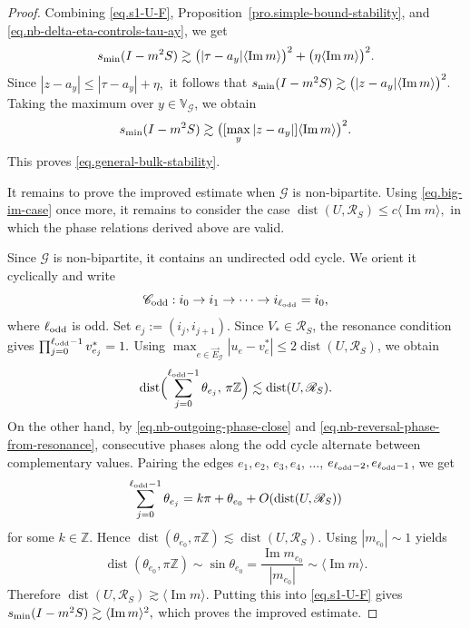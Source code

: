 \documentclass[11pt,twoside, a4paper]{article}
\numberwithin{equation}{section}
\numberwithin{figure}{section}
\theoremstyle{plain} %
\theoremstyle{definition}
\theoremstyle{remark}
\newcommand{\1} {\mspace{1 mu}}
\newcommand{\2} {\mspace{2 mu}}
\DeclareMathOperator{\im}{Im}
\DeclareMathOperator{\dist}{dist}
\begin{document}
\begin{proof}
Combining \eqref{eq.s1-U-F}, Proposition~\ref{pro.simple-bound-stability}, and
\eqref{eq.nb-delta-eta-controls-tau-ay}, we get
\[
    s_{\rm min}(I-m^2S)
    \gtrsim
    \bigl(|\tau-a_y|\langle\im m\rangle\bigr)^2
    +
    \bigl(\eta\langle\im m\rangle\bigr)^2 .
\]
Since
$
    |z-a_y|\le |\tau-a_y|+\eta,
$
it follows that
$
    s_{\rm min}(I-m^2S)
    \gtrsim
    \bigl(|z-a_y|\langle\im m\rangle\bigr)^2.
$
Taking the maximum over \(y\in \mathbb{V}_{\mathcal G}\), we obtain
\[
    s_{\rm min}(I-m^2S)
    \gtrsim
    \bigl([\max_y|z-a_y|]\langle\im m\rangle\bigr)^2.
\]
This proves \eqref{eq.general-bulk-stability}.


It remains to prove the improved estimate when \(\mathcal G\) is non-bipartite. Using \eqref{eq.big-im-case} once more, it remains to consider the case
$
    \dist(U,\mathscr R_S)\le c\langle \im m\rangle,
$
in which the phase relations derived above are valid.




    Since \(\mathcal G\) is non-bipartite, it contains an undirected odd cycle.
    We orient it cyclically and write
    \[
        \mathscr C_{\rm odd}:
        i_0\to i_1\to\cdots\to i_{\ell_{\rm odd}}=i_0,
    \]
    where \(\ell_{\rm odd}\) is odd.
Set \(e_j:=(i_j,i_{j+1})\). Since \(V_*\in\mathscr R_S\), the resonance condition gives
$
    \prod_{j=0}^{\ell_{\rm odd}-1} v^*_{e_j}=1.
$
Using \(\max_{e\in\vec E_{\mathcal G}}|u_e-v^*_e|\le 2\dist(U,\mathscr R_S)\), we obtain
\[
    \dist\Bigl(\sum_{j=0}^{\ell_{\rm odd}-1}\theta_{e_j},\,\pi\mathbb Z\Bigr)
    \lesssim
    \dist(U,\mathscr R_S).
\]
On the other hand, by \eqref{eq.nb-outgoing-phase-close} and
\eqref{eq.nb-reversal-phase-from-resonance}, consecutive phases along the odd
cycle alternate between complementary values. Pairing the edges
\(e_1,e_2\), \(e_3,e_4\), \(\dots\), \(e_{\ell_{\rm odd}-2},e_{\ell_{\rm odd}-1}\), we get
\[
    \sum_{j=0}^{\ell_{\rm odd}-1}\theta_{e_j}
    =
    k\pi+\theta_{e_0}+O(\dist(U,\mathscr R_S))
\]
for some \(k\in\mathbb Z\). Hence
$
    \dist(\theta_{e_0},\pi\mathbb Z)\lesssim\dist(U,\mathscr R_S).
$
Using $|m_{e_0}|\sim 1$ yields
\[
    \dist(\theta_{e_0},\pi\mathbb Z)
    \sim
    \sin\theta_{e_0}
    =
    \frac{\im m_{e_0}}{|m_{e_0}|}
    \sim
    \langle\im m\rangle.
\]
Therefore
$
    \dist(U,\mathscr R_S)\gtrsim\langle\im m\rangle.
$
Putting this into \eqref{eq.s1-U-F} gives
$
    s_{\rm min}(I-m^2S)\gtrsim \langle\im m\rangle^2,
$
which proves the improved estimate.
\end{proof}

\bigskip
\end{document}
